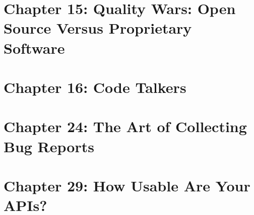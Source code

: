\documentclass[]{uva-bachelor-thesis}
\def \CurrChapter {}
\def \CurrSection {}
\renewcommand{\chaptermark}[1]{\def \CurrChapter {#1} \def \CurrSection {}}
\begin{document}
\chapter{Chapter 15: Quality Wars: Open Source Versus Proprietary Software}

\chapter{Chapter 16: Code Talkers}

\chapter{Chapter 24: The Art of Collecting Bug Reports}

\chapter{Chapter 29: How Usable Are Your APIs?}



\chaptermark{Bibliography}
\end{document}
